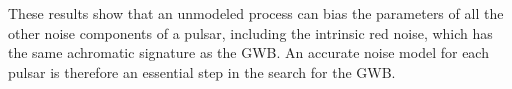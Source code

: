 These results show that an unmodeled process can bias the parameters of
all the other noise components of a pulsar, including the intrinsic red
noise, which has the same achromatic signature as the GWB. An accurate
noise model for each pulsar is therefore an essential step in the search
for the GWB.

